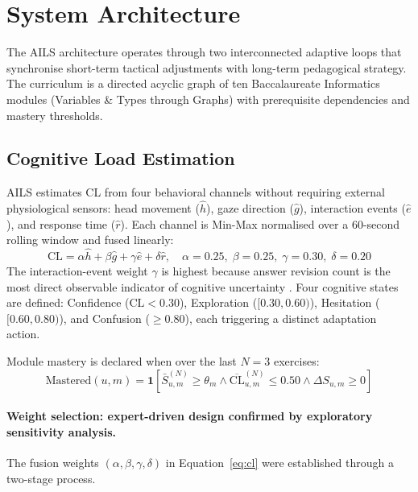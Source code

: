 \documentclass[ASNA,twocolumn]{USG} %
\begin{document}
\section{System Architecture}
\label{sec:architecture}

The AILS architecture operates through two interconnected adaptive
loops that synchronise short-term tactical adjustments with long-term
pedagogical strategy. The curriculum is a directed acyclic graph of
ten Baccalaureate Informatics modules (Variables \& Types through
Graphs) with prerequisite dependencies and mastery thresholds.

\subsection{Cognitive Load Estimation}

AILS estimates CL from four behavioral channels without requiring
external physiological sensors: head movement ($\hat{h}$), gaze
direction ($\hat{g}$), interaction events ($\hat{e}$), and response
time ($\hat{r}$). Each channel is Min-Max normalised over a 60-second
rolling window and fused linearly:
\begin{equation}
\label{eq:cl}
\text{CL} = \alpha\hat{h} + \beta\hat{g} + \gamma\hat{e} + \delta\hat{r},
\quad \alpha{=}0.25,\;\beta{=}0.25,\;\gamma{=}0.30,\;\delta{=}0.20
\end{equation}
The interaction-event weight $\gamma$ is highest because answer
revision count is the most direct observable indicator of cognitive
uncertainty \cite{Chen2014}. Four cognitive states are defined:
Confidence ($\text{CL}<0.30$), Exploration ($[0.30,0.60)$),
Hesitation ($[0.60,0.80)$), and Confusion ($\geq 0.80$), each
triggering a distinct adaptation action.

Module mastery is declared when over the last $N{=}3$ exercises:
\begin{equation}
\label{eq:mastery}
\text{Mastered}(u,m) = \mathbf{1}\!\left[
  \bar{S}^{(N)}_{u,m} \geq \theta_m \wedge
  \overline{\text{CL}}^{(N)}_{u,m} \leq 0.50 \wedge
  \Delta S_{u,m} \geq 0
\right]
\end{equation}
\paragraph{Weight selection: expert-driven design confirmed by
exploratory sensitivity analysis.}
The fusion weights $(\alpha, \beta, \gamma, \delta)$ in
Equation~\eqref{eq:cl} were established through a two-stage process.
\end{document}
